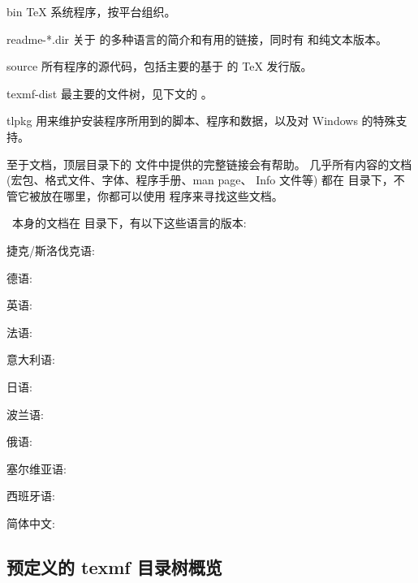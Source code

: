 \documentclass{article}
\begin{document}
\begin{ttdescription}
\item[bin] \TeX{} 系统程序，按平台组织。

\item[readme-*.dir] 关于 \TL{} 的多种语言的简介和有用的链接，同时有 \HTML{}
和纯文本版本。

\item[source] 所有程序的源代码，包括主要的基于 \Webc{} 的 \TeX{} 发行版。

\item[texmf-dist] 最主要的文件树，见下文的 。

\item[tlpkg] 用来维护安装程序所用到的脚本、程序和数据，以及对 Windows 的特殊支持。
\end{ttdescription}

至于文档，顶层目录下的  文件中提供的完整链接会有帮助。
几乎所有内容的文档 (宏包、格式文件、字体、程序手册、man page、 Info 文件等) 都在
 目录下，不管它被放在哪里，你都可以使用
 程序来寻找这些文档。

\TL\ 本身的文档在  目录下，有以下这些语言的版本: 

\begin{itemize*}
\item{捷克/斯洛伐克语:} 
\item{德语:} 
\item{英语:} 
\item{法语:} 
\item{意大利语:} 
\item{日语:} 
\item{波兰语:} 
\item{俄语:} 
\item{塞尔维亚语:} 
\item{西班牙语:} 
\item{简体中文:} 
\end{itemize*}


\subsection{预定义的 texmf 目录树概览}
\label{sec:texmftrees}
\end{document}
